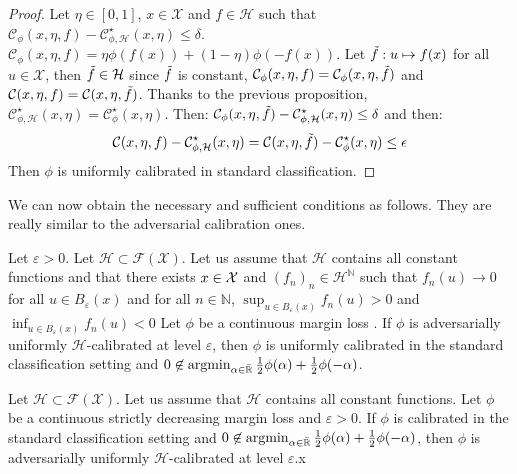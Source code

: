 \begin{proof}
Let $\eta\in[0,1]$, $x\in\mathcal{X}$ and $f\in\mathcal{H}$ such that $ \mathcal{C}_{\phi}(x,\eta,f)- \mathcal{C}^\star_{\phi,\mathcal{H}}(x,\eta)\leq\delta$.  $\mathcal{C}_{\phi}(x,\eta,f) = \eta\phi(f(x))+(1-\eta)\phi(-f(x))$. Let $\Tilde{f}:u\mapsto f(x)$ for all $u\in\mathcal{X}$, then $\Tilde{f}\in\mathcal{H}$ since $\Tilde{f}$ is constant, $\mathcal{C}_{\phi}(x,\eta,f) = \mathcal{C}_{\phi}(x,\eta,\Tilde{f})$ and $\mathcal{C}(x,\eta,f) = \mathcal{C}(x,\eta,\Tilde{f})$. Thanks to the previous proposition, $\mathcal{C}^\star_{\phi,\mathcal{H}}(x,\eta)=\mathcal{C}^\star_{\phi}(x,\eta)$. Then: $ \mathcal{C}_{\phi}(x,\eta,\Tilde{f})-\mathcal{C}^\star_{\phi,\mathcal{H}}(x,\eta)\leq \delta$ and then:
\begin{align*}
    \mathcal{C}(x,\eta,f)-\mathcal{C}^\star_{\phi,\mathcal{H}}(x,\eta) =  \mathcal{C}(x,\eta,\Tilde{f})-\mathcal{C}^\star_{\phi}(x,\eta) \leq \epsilon
\end{align*}
Then $\phi$ is uniformly calibrated in standard classification.
\end{proof}

We can now obtain the necessary and sufficient conditions as follows. They are really similar to the adversarial calibration ones. 



\begin{prop*} 
Let $\varepsilon>0$. Let $\mathcal{H}\subset \mathcal{F}(\mathcal{X})$. Let us assume that $\mathcal{H}$ contains all constant functions and that there exists $x\in\mathcal{X}$ and $(f_n)_n\in\mathcal{H}^\mathbb{N}$ such that $f_n(u)\to 0$ for all $ u\in B_\varepsilon(x)$ and for all $n\in\mathbb{N}$, $\sup_{u\in B_\varepsilon(x)} f_n(u)>0$ and  $\inf_{u\in B_\varepsilon(x)} f_n(u)<0$ 
Let $\phi$  be a continuous margin loss .  If $\phi$ is adversarially uniformly $\mathcal{H}$-calibrated at level $\varepsilon$, then $\phi$ is uniformly calibrated in the standard classification setting and $0\not\in \operatorname*{argmin}_{\alpha\in\bar{\mathbb{R}}}
\frac12\phi(\alpha)+\frac12\phi(-\alpha)$. 

\end{prop*}

\begin{prop*}
Let $\mathcal{H}\subset \mathcal{F}(\mathcal{X})$. Let us assume that $\mathcal{H}$ contains all constant functions.
Let $\phi$  be a continuous strictly decreasing margin loss and $\varepsilon>0$. If $\phi$ is calibrated in the standard classification setting and $0\not\in \operatorname*{argmin}_{\alpha\in\bar{\mathbb{R}}}
\frac12\phi(\alpha)+\frac12\phi(-\alpha)$, then $\phi$ is adversarially uniformly $\mathcal{H}$-calibrated at level $\varepsilon$.x


\end{prop*}


